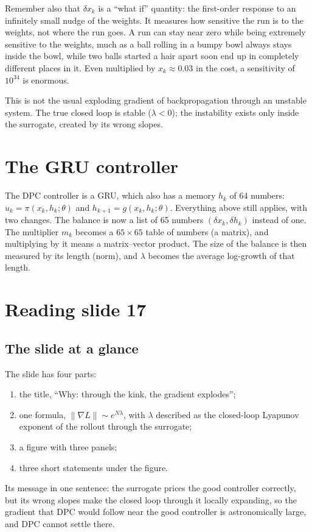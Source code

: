 \documentclass[11pt]{article}
\begin{document}
Remember also that $\delta x_k$ is a ``what if'' quantity: the first-order response to an infinitely small nudge of the weights. It measures how sensitive the run is to the weights, not where the run goes. A run can stay near zero while being extremely sensitive to the weights, much as a ball rolling in a bumpy bowl always stays inside the bowl, while two balls started a hair apart soon end up in completely different places in it. Even multiplied by $x_k\approx0.03$ in the cost, a sensitivity of $10^{34}$ is enormous.

This is not the usual exploding gradient of backpropagation through an unstable system. The true closed loop is stable ($\lambda<0$); the instability exists only inside the surrogate, created by its wrong slopes.

\section{The GRU controller}

The DPC controller is a GRU, which also has a memory $h_k$ of 64 numbers: $u_k=\pi(x_k,h_k;\theta)$ and $h_{k+1}=g(x_k,h_k;\theta)$. Everything above still applies, with two changes. The balance is now a list of 65 numbers $(\delta x_k,\delta h_k)$ instead of one. The multiplier $m_k$ becomes a $65\times65$ table of numbers (a matrix), and multiplying by it means a matrix--vector product. The size of the balance is then measured by its length (norm), and $\lambda$ becomes the average log-growth of that length.

\section{Reading slide 17}

\subsection{The slide at a glance}

The slide has four parts:
\begin{enumerate}
\item the title, ``Why: through the kink, the gradient explodes'';
\item one formula, $\|\nabla L\|\sim e^{N\lambda}$, with $\lambda$ described as the closed-loop Lyapunov exponent of the rollout through the surrogate;
\item a figure with three panels;
\item three short statements under the figure.
\end{enumerate}
Its message in one sentence: the surrogate prices the good controller correctly, but its wrong slopes make the closed loop through it locally expanding, so the gradient that DPC would follow near the good controller is astronomically large, and DPC cannot settle there.
\end{document}
